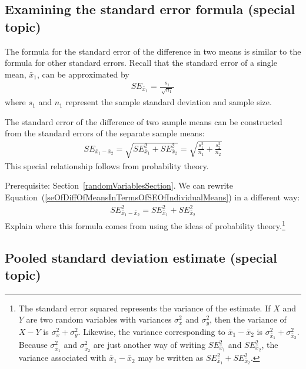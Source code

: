 {


\subsection{Examining the standard error formula (special topic)}

The formula for the standard error of the difference in two means is similar to the formula for other standard errors. Recall that the standard error of a single mean, $\bar{x}_1$, can be approximated by
\begin{align*}
SE_{\bar{x}_1} = \frac{s_1}{\ \sqrt{n_1}\ }
\end{align*}
where $s_1$ and $n_1$ represent the sample standard deviation and sample size.

The standard error of the difference of two sample means can be constructed from the standard errors of the separate sample means:
\begin{eqnarray}
SE_{\bar{x}_{1} - \bar{x}_{2}}
	= \sqrt{SE_{\bar{x}_1}^2 + SE_{\bar{x}_2}^2}
	= \sqrt{\frac{s_1^2}{{n_1}} + \frac{s_2^2}{{n_2}}}
\label{seOfDiffOfMeansInTermsOfSEOfIndividualMeans}
\end{eqnarray}
This special relationship follows from probability theory.

\begin{exercise}\label{derivingSEForDiffOfTwoMeansExercise}
Prerequisite: Section~\ref{randomVariablesSection}.
We can rewrite Equation~(\ref{seOfDiffOfMeansInTermsOfSEOfIndividualMeans}) in a different way:
\begin{eqnarray*}
SE_{\bar{x}_{1} - \bar{x}_{2}}^2 = SE_{\bar{x}_1}^2 + SE_{\bar{x}_2}^2
\end{eqnarray*}
Explain where this formula comes from using the ideas of probability theory.\footnote{The standard error squared represents the variance of the estimate. If $X$ and $Y$ are two random variables with variances $\sigma_x^2$ and $\sigma_y^2$, then the variance of $X-Y$ is $\sigma_x^2 + \sigma_y^2$. Likewise, the variance corresponding to $\bar{x}_1 - \bar{x}_2$ is $\sigma_{\bar{x}_1}^2 + \sigma_{\bar{x}_2}^2$. Because $\sigma_{\bar{x}_1}^2$ and $\sigma_{\bar{x}_2}^2$ are just another way of writing $SE_{\bar{x}_1}^2$ and  $SE_{\bar{x}_2}^2$, the variance associated with $\bar{x}_1 - \bar{x}_2$ may be written as $SE_{\bar{x}_1}^2 + SE_{\bar{x}_2}^2$.}
\end{exercise}


\subsection{Pooled standard deviation estimate (special topic)}
\label{pooledStandardDeviations}

}
